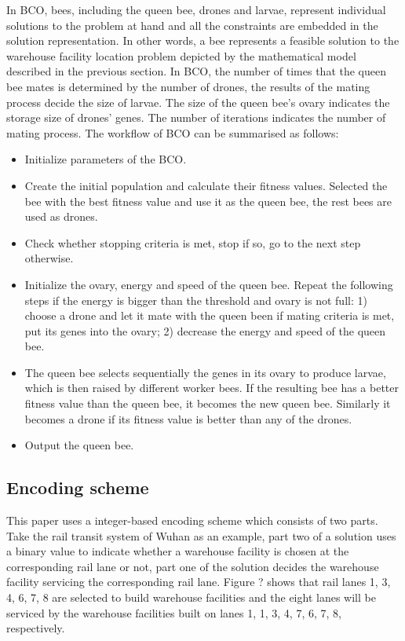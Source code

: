In BCO, bees, including the queen bee, drones and larvae, represent individual solutions to the problem at hand and all the constraints are embedded in the solution representation.
In other words, a bee represents a feasible solution to the warehouse facility location problem depicted by the mathematical model described in the previous section.
In BCO, the number of times that the queen bee mates is determined by the number of drones, the results of the mating process decide the size of larvae.
The size of the queen bee's ovary indicates the storage size of drones' genes.
The number of iterations indicates the number of mating process.
The workflow of BCO can be summarised as follows:
\begin{itemize}
	\item Initialize parameters of the BCO.
	\item Create the initial population and calculate their fitness values. Selected the bee with the best fitness value and use it as the queen bee, the rest bees are used as drones.
	\item Check whether stopping criteria is met, stop if so, go to the next step otherwise.
	\item Initialize the ovary, energy and speed of the queen bee. 
	Repeat the following steps if the energy is bigger than the threshold and ovary is not full: 1) choose a drone and let it mate with the queen been if mating criteria is met, put its genes into the ovary; 2) decrease the energy and speed of the queen bee.
	\item The queen bee selects sequentially the genes in its ovary to produce larvae, which is then raised by different worker bees. If the resulting bee has a better fitness value than the queen bee, it becomes the new queen bee. Similarly it becomes a drone if its fitness value is better than any of the drones.
	\item Output the queen bee.
\end{itemize}



\subsection{Encoding scheme}
This paper uses a integer-based encoding scheme which consists of two parts.
Take the rail transit system of Wuhan as an example, part two of a solution uses a binary value to indicate whether a warehouse facility is chosen at the corresponding rail lane or not, part one of the solution decides the warehouse facility servicing the corresponding rail lane.
Figure ? shows that rail lanes 1, 3, 4, 6, 7, 8 are selected to build warehouse facilities and the eight lanes will be serviced by the warehouse facilities built on lanes 1, 1, 3, 4, 7, 6, 7, 8, respectively.

